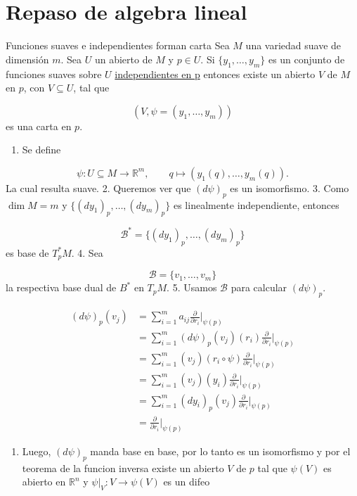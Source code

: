\section{Repaso de algebra lineal}
\begin{bookproposition}{Funciones suaves e independientes forman carta}
Sea $M$ una variedad suave de dimensión $m$. Sea $U$ un abierto de $M$ y $p\in U$. Si $\{y_1,\ldots,y_m\}$ es un conjunto de funciones suaves sobre $U$ \hyperref[blk:conjunto-funciones-independientes]{independientes en p} entonces existe un abierto $V$ de $M$ en $p$, con $V\subseteq U$, tal que

\[
(V,\psi=(y_1,\ldots,y_m))
\]
es una carta en $p$.

\end{bookproposition}
\begin{bookproof}{}
\begin{enumerate}
\item Se define
\end{enumerate}
\[
\psi:U \subseteq M \to \mathbb R^m,\qquad q \mapsto (y_1(q),\ldots,y_m(q)).
\]
La cual resulta suave. 2. Queremos ver que $(d\psi)_p$ es un isomorfismo. 3. Como $\dim M=m$ y $\{(dy_1)_p,\ldots,(dy_m)_p\}$ es linealmente independiente, entonces

\[
\mathcal B^*=\{(dy_1)_p,\ldots,(dy_m)_p\}
\]
es base de $T_p^*M$. 4. Sea

\[
\mathcal B=\{v_1,\ldots,v_m\}
\]
la respectiva base dual de $B^{*}$ en $T_pM$. 5. Usamos $\mathcal B$ para calcular $(d\psi)_p$.

\[
\begin{aligned}(d\psi)_p(v_j)&=\sum_{i=1}^m a_{ij}\frac{\partial}{\partial r_i}\Big|_{\psi(p)}\\&=\sum_{i=1}^m (d\psi)_{p}(v_{j})(r_{i})\frac{\partial}{\partial r_i}\Big|_{\psi(p)}\\&=\sum_{i=1}^m (v_{j})(r_{i}\circ\psi)\frac{\partial}{\partial r_i}\Big|_{\psi(p)}\\&=\sum_{i=1}^m (v_{j})(y_{i})\frac{\partial}{\partial r_i}\Big|_{\psi(p)}\\&=\sum_{i=1}^m (dy_{i})_{p}(v_{j})\frac{\partial}{\partial r_i}\Big|_{\psi(p)}\\&=\frac{\partial}{\partial r_i}\Big|_{\psi(p)}\end{aligned}
\]
\begin{enumerate}[start=6]
\item Luego, $(d\psi)_p$ manda base en base, por lo tanto es un isomorfismo y por el teorema de la funcion inversa existe un abierto $V$ de $p$ tal que $\psi(V)$ es abierto en $\mathbb{R}^{n}$ y $\psi|_{V}:V\rightarrow\psi(V)$ es un difeo
\end{enumerate}
\bookqed
\end{bookproof}
